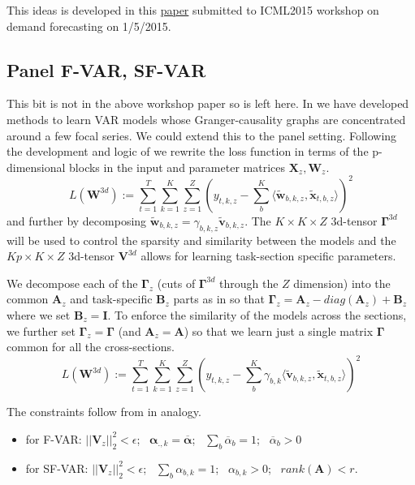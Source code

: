 \documentclass[a4paper]{article}
\newcommand{\vc}[1]{\mathbf{#1}}
\begin{document}
This ideas is developed in this \href{http://www.gail.unige.ch/mediawiki/index.php/File:PanelVAR_ICML2015WS_v02.pdf}{paper} submitted to ICML2015 workshop on demand forecasting on 1/5/2015.

\subsection{Panel F-VAR, SF-VAR}
This bit is not in the above workshop paper so is left here.
In \cite{Gregorova2015} we have developed methods to learn VAR models whose Granger-causality graphs are concentrated around a few focal series. We could extend this to the panel setting. 
Following the development and logic of \cite{Gregorova2015} we rewrite the loss function in terms of the p-dimensional blocks in the input and parameter matrices $\vc{X}_z, \vc{W}_z$.
\begin{equation}\label{eq:SquarredLossBlocks}
\mathit{L}(\vc{W}^{3d}):= \sum_{t=1}^T \sum_{k=1}^K \sum_{z=1}^Z (y_{t,k,z} - \sum_b^K \langle \vc{\tilde{w}}_{b,k,z}, \vc{\tilde{x}}_{t,b,z} \rangle )^2
\end{equation} 
and further by decomposing $\vc{\tilde{w}}_{b,k,z} = \gamma_{b,k,z} \vc{\tilde{v}}_{b,k,z}$. 
The $K \times K \times Z$ 3d-tensor $\vc{\Gamma}^{3d}$ will be used to control the sparsity and similarity between the models and the $Kp \times K \times Z$ 3d-tensor $\vc{V}^{3d}$ allows for learning task-section specific parameters.

We decompose each of the $\vc{\Gamma}_z$ (cuts of $\vc{\Gamma}^{3d}$ through the $Z$ dimension) into the common $\vc{A}_z$ and task-specific $\vc{B}_z$ parts as in \cite{Gregorova2015} so that $\vc{\Gamma}_z = \vc{A}_z - diag(\vc{A}_z) + \vc{B}_z$ where we set $\vc{B}_z = \vc{I}$.
To enforce the similarity of the models across the sections, we further set $\vc{\Gamma}_z = \vc{\Gamma}$ (and $\vc{A}_z = \vc{A}$) so that we learn just a single matrix $\vc{\Gamma}$ common for all the cross-sections.
\begin{equation}\label{eq:SquarredLossBlocks}
\mathit{L}(\vc{W}^{3d}):= \sum_{t=1}^T \sum_{k=1}^K \sum_{z=1}^Z (y_{t,k,z} - \sum_b^K \gamma_{b,k} \langle \vc{\tilde{v}}_{b,k,z}, \vc{\tilde{x}}_{t,b,z} \rangle )^2
\end{equation} 

The constraints follow from \cite{Gregorova2015} in analogy.
\begin{itemize}
\item for F-VAR: $||\vc{V}_z||_2^2 < \epsilon$; \, $\vc{\alpha}_{.,k} = {\overline{\vc{\alpha}}}$; \, $\sum_b {\overline{\alpha}}_b = 1$; \, ${\overline{\alpha}}_b > 0$
\item for SF-VAR: $||\vc{V}_z||_2^2 < \epsilon$; \, $\sum_b \alpha_{b,k} = 1$; \, $\alpha_{b,k} > 0$; \, $rank(\vc{A}) < r$.
\end{itemize}
\end{document}

